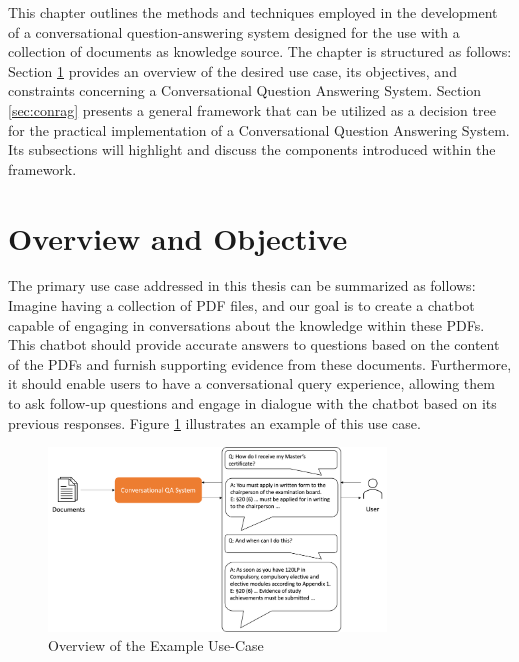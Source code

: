 This chapter outlines the methods and techniques employed in the development of a conversational question-answering system designed for the use with a collection of documents as knowledge source. The chapter is structured as follows: Section \ref{sec:overview} provides an overview of the desired use case, its objectives, and constraints concerning a Conversational Question Answering System. Section \ref{sec:conrag} presents a general framework that can be utilized as a decision tree for the practical implementation of a Conversational Question Answering System. Its subsections will highlight and discuss the components introduced within the framework.

\section{Overview and Objective}
\label{sec:overview}

The primary use case addressed in this thesis can be summarized as follows: Imagine having a collection of PDF files, and our goal is to create a chatbot capable of engaging in conversations about the knowledge within these PDFs. This chatbot should provide accurate answers to questions based on the content of the PDFs and furnish supporting evidence from these documents. Furthermore, it should enable users to have a conversational query experience, allowing them to ask follow-up questions and engage in dialogue with the chatbot based on its previous responses. Figure \ref{fig:use-case} illustrates an example of this use case.

\begin{figure}
    \centering
    \includegraphics[width=0.8\textwidth]{Grafiken/Use_Case.png}
    \caption{Overview of the Example Use-Case}
    \label{fig:use-case}
\end{figure}

